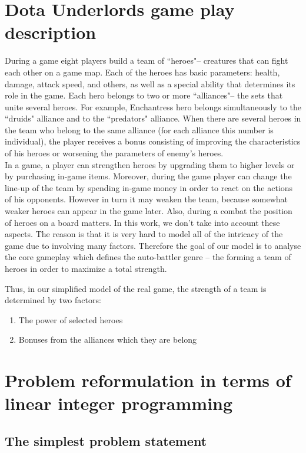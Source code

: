 \documentclass[smallextended]{svjour3}       %
\begin{document}
\section{Dota Underlords game play description}
\label{SectionDUDescription}
During a game eight players build a team of ``heroes"-- creatures that can fight each other on a game map. Each of the heroes has basic parameters: health, damage, attack speed, and others, as well as a special ability that determines its role in the game. Each hero belongs to two or more ``alliances"-- the sets that unite several heroes. For example, Enchantress hero belongs simultaneously to the ``druids" alliance and to the ``predators" alliance. When there are several heroes in the team who belong to the same alliance (for each alliance this number is individual), the player receives a bonus consisting of improving the characteristics of his heroes or worsening the parameters of enemy's heroes.\\
In a game, a player can strengthen heroes by upgrading them to higher levels or by purchasing in-game items. Moreover, during the game player can change the line-up of the team by spending in-game money in order to react on the actions of his opponents. However in turn it may weaken the team, because somewhat weaker heroes can appear in the game later. Also, during a combat the position of heroes on a board matters. In this work, we don't take into account these aspects. The reason is that it is very hard to model all of the intricacy of the game due to involving many factors. Therefore the goal of our model is to analyse the core gameplay which defines the auto-battler genre -- the forming a team of heroes in order to maximize a total strength.

Thus, in our simplified model of the real game, the strength of a team is determined by two factors:
\begin{enumerate}
    \item The power of selected heroes
    \item Bonuses from the alliances which they are belong
\end{enumerate}


\section{Problem reformulation in terms of linear integer programming}
\label{SectionDUIP}

\subsection{The simplest problem statement}
\end{document}
